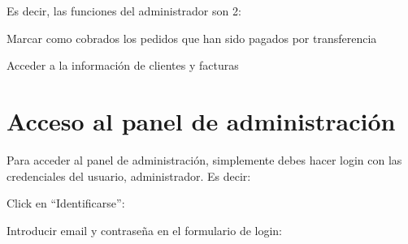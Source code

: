 \documentclass[12pt, spanish]{article} %
\begin{document}
Es decir, las funciones del administrador son 2:

\begin{steps}
  \item Marcar como cobrados los pedidos que han sido pagados por transferencia
  \item Acceder a la información de clientes y facturas
\end{steps}


\section{Acceso al panel de administración}

Para acceder al panel de administración, simplemente debes hacer login con las credenciales
del usuario, administrador. Es decir:

\begin{steps}
    \item Click en ``Identificarse'':

        \medskip
        \begin{minipage}[t]{\linewidth}
        \raggedright
    \end{minipage}
    \item Introducir email y contraseña en el formulario de login:

        \medskip
        \begin{minipage}[t]{\linewidth}
        \raggedright
    \end{minipage}
\end{steps}
\end{document}
